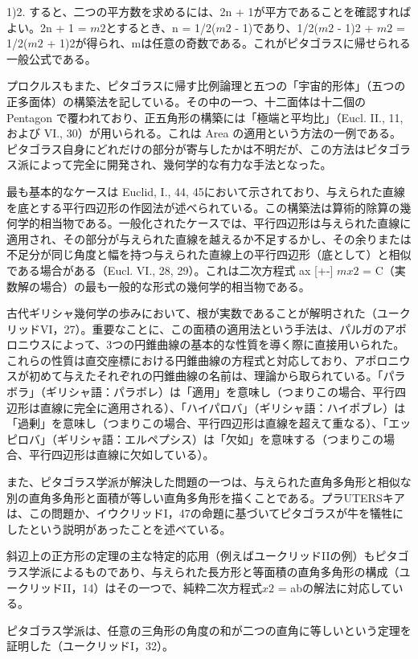 \documentclass[a4paper,11pt,openany]{ltjsbook}
\begin{document}
1)2. すると、二つの平方数を求めるには、2n + 1が平方であることを確認すればよい。2n + 1 = $m{2}$とするとき、n = 1/2($m{2}$ - 1)であり、{1/2($m{2}$ - 1)}2 + $m{2}$ = {1/2($m{2}$ + 1)}2が得られ、mは任意の奇数である。これがピタゴラスに帰せられる一般公式である。

プロクルスもまた、ピタゴラスに帰す比例論理と五つの「宇宙的形体」（五つの正多面体）の構築法を記している。その中の一つ、十二面体は十二個の Pentagon で覆われており、正五角形の構築には「極端と平均比」（Eucl. II., 11, および VI., 30）が用いられる。これは Area の適用という方法の一例である。ピタゴラス自身にどれだけの部分が寄与したかは不明だが、この方法はピタゴラス派によって完全に開発され、幾何学的な有力な手法となった。

最も基本的なケースは Euclid, I., 44, 45において示されており、与えられた直線を底とする平行四辺形の作図法が述べられている。この構築法は算術的除算の幾何学的相当物である。一般化されたケースでは、平行四辺形は与えられた直線に適用され、その部分が与えられた直線を越えるか不足するかし、その余りまたは不足分が同じ角度と幅を持つ与えられた直線上の平行四辺形（底として）と相似である場合がある（Eucl. VI., 28, 29）。これは二次方程式 ax [+-] $mx{2}$ = C（実数解の場合）の最も一般的な形式の幾何学的相当物である。

古代ギリシャ幾何学の歩みにおいて、根が実数であることが解明された（ユークリッドVI，27）。重要なことに、この面積の適用法という手法は、パルガのアポロニウスによって、3つの円錐曲線の基本的な性質を導く際に直接用いられた。これらの性質は直交座標における円錐曲線の方程式と対応しており、アポロニウスが初めて与えたそれぞれの円錐曲線の名前は、理論から取られている。「パラボラ」（ギリシャ語：パラボレ）は「適用」を意味し（つまりこの場合、平行四辺形は直線に完全に適用される）、「ハイパロバ」（ギリシャ語：ハイポブレ）は「過剰」を意味し（つまりこの場合、平行四辺形は直線を超えて重なる）、「エッピロバ」（ギリシャ語：エルペプシス）は「欠如」を意味する（つまりこの場合、平行四辺形は直線に欠如している）。

また、ピタゴラス学派が解決した問題の一つは、与えられた直角多角形と相似な別の直角多角形と面積が等しい直角多角形を描くことである。プラUTERSキアは、この問題か、イウクリッドI，47の命題に基づいてピタゴラスが牛を犠牲にしたという説明があったことを述べている。

斜辺上の正方形の定理の主な特定的応用（例えばユークリッドIIの例）もピタゴラス学派によるものであり、与えられた長方形と等面積の直角多角形の構成（ユークリッドII，14）はその一つで、純粋二次方程式$x{2}$ = abの解法に対応している。

ピタゴラス学派は、任意の三角形の角度の和が二つの直角に等しいという定理を証明した（ユークリッドI，32）。
\end{document}
